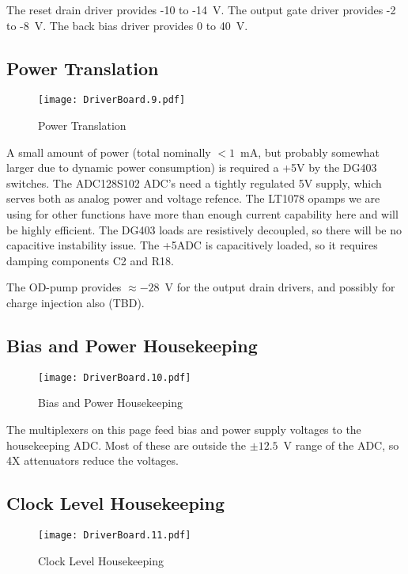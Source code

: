 \documentclass[a4paper,12pt]{article}
\begin{document}
The reset drain driver provides -10 to -14\ V. 
The output gate driver provides -2 to -8\ V.
The back bias driver provides 0 to 40\ V.

\subsection{Power Translation}
   \begin{figure}
   \begin{center}
   \texttt{[image: DriverBoard.9.pdf]}
   \end{center}
   \caption{Power Translation}
   \end{figure}
  
A small amount of power (total nominally $<1$\ mA, but probably somewhat larger due to dynamic power consumption) is required a +5V by the DG403 switches. The ADC128S102 ADC's need a tightly regulated 5V supply, which serves both as analog power and voltage refence. The LT1078 opamps we are using for other functions have more than enough current capability here and will be highly efficient. The DG403 loads are resistively decoupled, so there will be no capacitive instability issue. The +5ADC is capacitively loaded, so it requires damping components C2 and R18.
  
The OD-pump provides $\approx -28$\ V for the output drain drivers, and possibly for charge injection also (TBD).

\subsection{Bias and Power Housekeeping}
   \begin{figure}
   \begin{center}
   \texttt{[image: DriverBoard.10.pdf]}
   \end{center}
   \caption{Bias and Power Housekeeping}
   \end{figure}

The multiplexers on this page feed bias and power supply voltages to the housekeeping ADC. Most of these are outside the $\pm 12.5$\ V range of the ADC, so 4X attenuators reduce the voltages.

\subsection{Clock Level Housekeeping}
   \begin{figure}
   \begin{center}
   \texttt{[image: DriverBoard.11.pdf]}
   \end{center}
   \caption{Clock Level Housekeeping}
   \end{figure}
\end{document}
